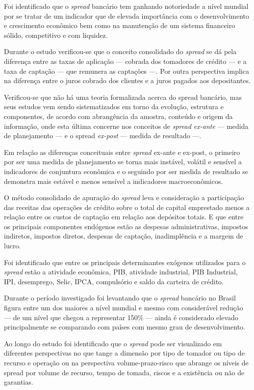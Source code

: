 \documentclass[
  12pt,
  12pt,
  openright,
  oneside,
  a4paper,
  chapter=TITLE,
  section=TITLE,
  subsection=TITLE,
  subsubsection=TITLE,
  english,
  portugues,
  sumario=tradicional]{abntex2}
\begin{document}
Foi identificado que o \emph{spread} bancário tem ganhando notoriedade a nível mundial por se tratar de um indicador que de elevada importância com o desenvolvimento e crescimento econômico bem como na manutenção de um sistema financeiro sólido, competitivo e com liquidez.

Durante o estudo verificou-se que o conceito consolidado do \emph{spread} se dá pela diferença entre as taxas de aplicação --- cobrada dos tomadores de crédito --- e a taxa de captação --- que remunera as captações ---. Por outra perspectiva implica na diferença entre o juros cobrado dos clientes e a juros pagados aos depositantes.

Verificou-se que não há uma teoria formalizada acerca do spread bancário, mas seus estudos vem sendo sistematizados em torno da evolução, estrutura e componentes, de acordo com abrangência da amostra, conteúdo e origem da informação, onde esta última concerne nos conceitos de \emph{spread ex-ante} --- medida de planejamento --- e o spread \emph{ex-post} --- medida de resultado ---.

Em relação as diferenças conceituais entre \emph{spread} ex-ante e ex-post, o primeiro por ser uma medida de planejamento se torna mais instável, volátil e sensível a indicadores de conjuntura econômica e o seguindo por ser medida de resultado se demonstra mais estável e menos sensível a indicadores macroeconômicos.

O método consolidado de apuração do \emph{spread} leva e consideração a participação das receitas das operações de crédito sobre o total de capital emprestado menos a relação entre os custos de captação em relação aos depósitos totais. E que entre os principais componentes endógenos estão as despesas administrativas, impostos indiretos, impostos diretos, despesas de captação, inadimplência e a margem de lucro.

Foi identificado que entre os principais determinantes exógenos utilizados para o \emph{spread} estão a atividade econômica, PIB, atividade industrial, PIB Industrial, IPI, desemprego, Selic, IPCA, compulsório e saldo da carteira de crédito.

Durante o período investigado foi levantando que o \emph{spread} bancário no Brasil figura entre um dos maiores a nível mundial e mesmo com considerável redução --- de um nível que chegou a representar 150\% --- ainda é considerado elevado principalmente se comparando com países com mesmo grau de desenvolvimento.

Ao longo do estudo foi identificado que o \emph{spread} pode ser visualizado em diferentes perspectivas no que tange a dimensão por tipo de tomador ou tipo de recurso e operação ou na perspectiva volume-prazo-risco que abrange os níveis de spread por volume de recurso, tempo de tomada, riscos e a existência ou não de garantias.
\end{document}
